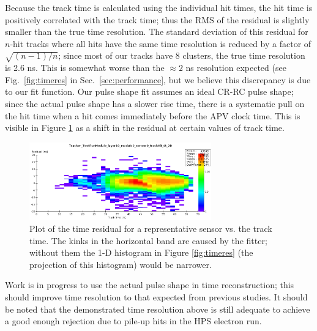 Because the track time is calculated using the individual hit times, the hit time is positively correlated 
with the track time; thus the RMS of the residual is slightly smaller than the true time resolution.
The standard deviation of this residual for $n$-hit tracks where all hits have the same time resolution 
is reduced by a factor of $\sqrt{(n-1)/n}$; since most of our tracks have 8 clusters, the true time 
resolution is 2.6 ns. 
This is somewhat worse than the $\approx 2$ ns resolution expected (see Fig.~\ref{fig:timeres} in 
Sec.~\ref{sec:performance}, but we believe this discrepancy is due to our fit function. Our pulse 
shape fit assumes an ideal CR-RC pulse shape; since the actual pulse shape has a slower rise time, 
there is a systematic pull on the hit time when a hit comes immediately before the APV clock time. 
This is visible in Figure \ref{fig:timeres_2D} as a shift in the residual at certain values of track time.
\begin{figure}[h]
	\includegraphics[width=0.7\textwidth]{test2012/svtperformance/timeres_2D}
	\caption{\small{Plot of the time residual for a representative sensor vs. the track time. 
		The kinks in the horizontal band are caused by the fitter; without them the 1-D histogram in Figure \ref{fig:timeres} (the projection of this histogram) would be narrower.} }
	\label{fig:timeres_2D}
\end{figure}
Work is in progress to use the actual pulse shape in time reconstruction; this should improve time resolution to that expected from previous studies. 
It should be noted that the demonstrated time resolution above is still adequate to achieve a good 
enough rejection due to pile-up hits in the HPS electron run. 





